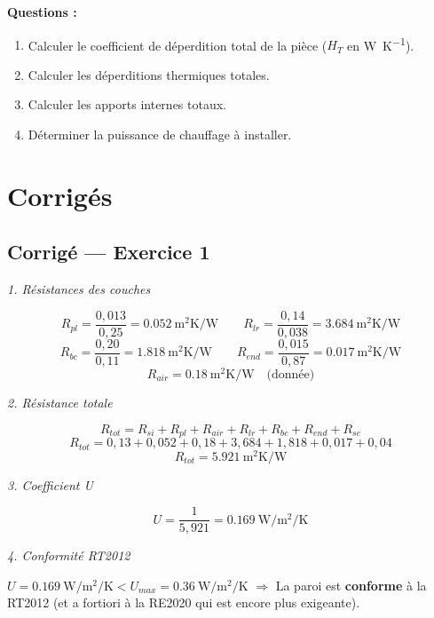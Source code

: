 \textbf{Questions :}
\begin{enumerate}
  \item Calculer le coefficient de déperdition total de la pièce (\(H_T\) en \si{\watt\per\kelvin}).
  \item Calculer les déperditions thermiques totales.
  \item Calculer les apports internes totaux.
  \item Déterminer la puissance de chauffage à installer.
\end{enumerate}

\newpage
\section*{Corrigés}

\subsection*{Corrigé — Exercice 1}

\textit{1. Résistances des couches}

\[
  R_{pl} = \frac{0{,}013}{0{,}25} = \SI{0,052}{\meter\squared\kelvin\per\watt}
  \qquad
  R_{lr} = \frac{0{,}14}{0{,}038} = \SI{3,684}{\meter\squared\kelvin\per\watt}
\]
\[
  R_{bc} = \frac{0{,}20}{0{,}11} = \SI{1,818}{\meter\squared\kelvin\per\watt}
  \qquad
  R_{end} = \frac{0{,}015}{0{,}87} = \SI{0,017}{\meter\squared\kelvin\per\watt}
\]
\[
  R_{air} = \SI{0,18}{\meter\squared\kelvin\per\watt} \quad \text{(donnée)}
\]

\textit{2. Résistance totale}

\[
  R_{tot} = R_{si} + R_{pl} + R_{air} + R_{lr} + R_{bc} + R_{end} + R_{se}
\]
\[
  R_{tot} = 0{,}13 + 0{,}052 + 0{,}18 + 3{,}684 + 1{,}818 + 0{,}017 + 0{,}04
\]
\[
  \boxed{R_{tot} = \SI{5,921}{\meter\squared\kelvin\per\watt}}
\]

\textit{3. Coefficient U}

\[
  \boxed{U = \frac{1}{5{,}921} = \SI{0,169}{\watt\per\meter\squared\per\kelvin}}
\]

\textit{4. Conformité RT2012}

\(U = \SI{0,169}{\watt\per\meter\squared\per\kelvin} < U_{max} = \SI{0,36}{\watt\per\meter\squared\per\kelvin}\)
\(\Rightarrow\) La paroi est \textbf{conforme} à la RT2012 (et a fortiori à la RE2020 qui est
encore plus exigeante).

